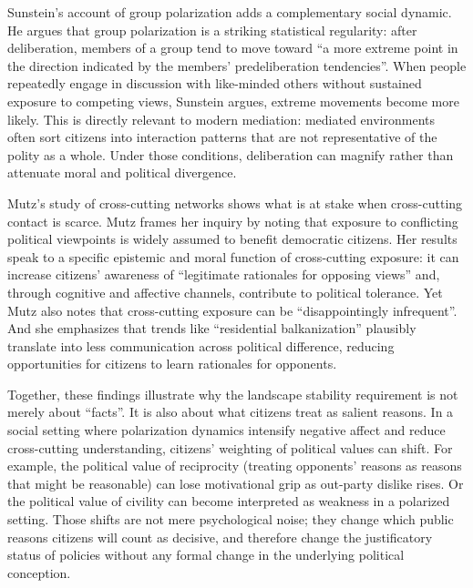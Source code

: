 \documentclass[12pt]{report}
\begin{document}
Sunstein’s account of group polarization adds a complementary social dynamic. He argues that group polarization is a striking statistical regularity: after deliberation, members of a group tend to move toward \enquote{a more extreme point in the direction indicated by the members’ predeliberation tendencies}.\parencite[p.~176]{sunstein2002groupPolarization} When people repeatedly engage in discussion with like-minded others without sustained exposure to competing views, Sunstein argues, extreme movements become more likely.\parencite[p.~176]{sunstein2002groupPolarization} This is directly relevant to modern mediation: mediated environments often sort citizens into interaction patterns that are not representative of the polity as a whole. Under those conditions, deliberation can magnify rather than attenuate moral and political divergence.

Mutz’s study of cross-cutting networks shows what is at stake when cross-cutting contact is scarce. Mutz frames her inquiry by noting that exposure to conflicting political viewpoints is widely assumed to benefit democratic citizens.\parencite[p.~111]{mutz2002crosscutting} Her results speak to a specific epistemic and moral function of cross-cutting exposure: it can increase citizens’ awareness of \enquote{legitimate rationales for opposing views} and, through cognitive and affective channels, contribute to political tolerance.\parencite[p.~118]{mutz2002crosscutting} Yet Mutz also notes that cross-cutting exposure can be \enquote{disappointingly infrequent}.\parencite[p.~111]{mutz2002crosscutting} And she emphasizes that trends like \enquote{residential balkanization} plausibly translate into less communication across political difference, reducing opportunities for citizens to learn rationales for opponents.\parencite[p.~122]{mutz2002crosscutting}

Together, these findings illustrate why the landscape stability requirement is not merely about \enquote{facts}. It is also about what citizens treat as salient reasons. In a social setting where polarization dynamics intensify negative affect and reduce cross-cutting understanding, citizens’ weighting of political values can shift. For example, the political value of reciprocity (treating opponents’ reasons as reasons that might be reasonable) can lose motivational grip as out-party dislike rises. Or the political value of civility can become interpreted as weakness in a polarized setting. Those shifts are not mere psychological noise; they change which public reasons citizens will count as decisive, and therefore change the justificatory status of policies without any formal change in the underlying political conception.
\end{document}

